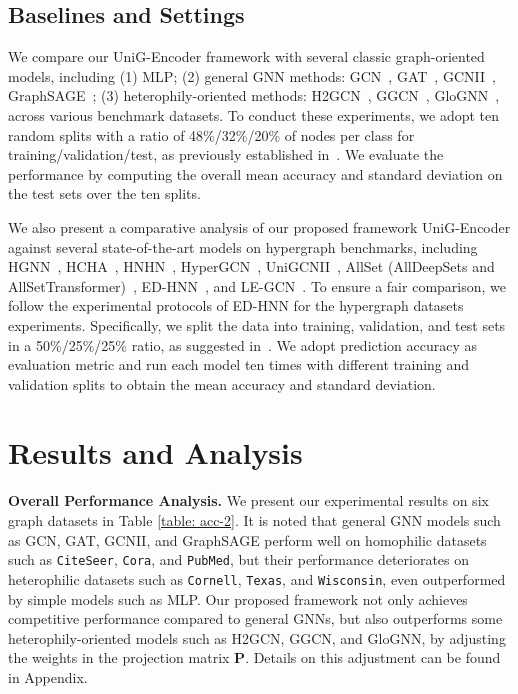\documentclass[review]{elsarticle}
\begin{document}
\subsection{Baselines and Settings}

We compare our UniG-Encoder framework with several classic graph-oriented models, including (1) MLP; (2) general GNN methods: GCN~\cite{kipf2016semi}, GAT~\cite{velickovic2017graph}, GCNII~\cite{chen2020simple}, GraphSAGE~\cite{hamilton2017inductive}; (3) heterophily-oriented methods: H2GCN~\cite{zhu2020beyond}, GGCN~\cite{yan2022two}, GloGNN~\cite{li2022finding}, across various benchmark datasets. To conduct these experiments, we adopt ten random splits with a ratio of 48\%/32\%/20\% of nodes per class for training/validation/test, as previously established in~\cite{li2022finding}. We evaluate the performance by computing the overall mean accuracy and standard deviation on the test sets over the ten splits.

We also present a comparative analysis of our proposed framework UniG-Encoder against several state-of-the-art models on hypergraph benchmarks, including HGNN~\cite{feng2019hypergraph}, HCHA~\cite{bai2021hypergraph}, HNHN~\cite{dong2020hnhn}, HyperGCN~\cite{yadati2019hypergcn}, UniGCNII~\cite{huang2021unignn}, AllSet (AllDeepSets and AllSetTransformer)~\cite{chien2021you}, ED-HNN~\cite{wang2022equivariant}, and LE-GCN~\cite{yang2022semi}. To ensure a fair comparison, we follow the experimental protocols of ED-HNN for the hypergraph datasets experiments. Specifically, we split the data into training, validation, and test sets in a 50\%/25\%/25\% ratio, as suggested in~\cite{chien2021you}. We adopt prediction accuracy as evaluation metric and run each model ten times with different training and validation splits to obtain the mean accuracy and standard deviation.

\section{Results and Analysis}

\textbf{Overall Performance Analysis.} We present our experimental results on six graph datasets in Table \ref{table: acc-2}. It is noted that general GNN models such as GCN, GAT, GCNII, and GraphSAGE perform well on homophilic datasets such as \texttt{CiteSeer}, \texttt{Cora}, and \texttt{PubMed}, but their performance deteriorates on heterophilic datasets such as \texttt{Cornell}, \texttt{Texas}, and \texttt{Wisconsin}, even outperformed by simple models such as MLP. Our proposed framework not only achieves competitive performance compared to general GNNs, but also outperforms some heterophily-oriented models such as H2GCN, GGCN, and GloGNN, by adjusting the weights in the projection matrix $\mathbf{P}$. Details on this adjustment can be found in Appendix.
\end{document}
